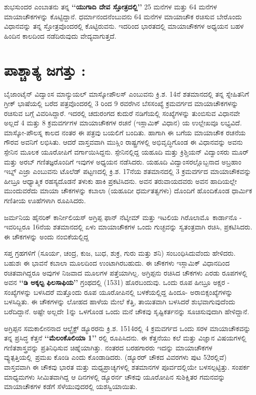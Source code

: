ಶುಭಸುಂದರ ಎಂಬಾತನು ತನ್ನ \textbf{‘‘ಯುಗಾದಿ ದೇವ ಸ್ತೋತ್ರದಲ್ಲಿ’’} 25 ಮನೆಗಳ ಮತ್ತು 64 ಮನೆಗಳ ಮಾಯಾಚೌಕಗಳನ್ನು ಕೊಟ್ಟಿದ್ದಾನೆ. ಧರ್ಮಾನಂದನೆಂಬುವನು 64 ಮನೆಗಳ ಮಾಯಾಚೌಕ ರಚಿಸುವ ಬೇರೊಂದು ವಿಧಾನವನ್ನು ತನ್ನ ಸ್ತೋತ್ರವೊಂದರಲ್ಲಿ ಕೊಟ್ಟಿರುವನು. ಇದರಿಂದ ಭಾರತದಲ್ಲಿ ಮಾಯಾಚೌಕಗಳ ಅಧ್ಯಯನ ಬಹಳ ಹಿಂದಿನ ಕಾಲದಿಂದ ನಡೆದಿರುವುದು ವೇದ್ಯವಾಗುತ್ತದೆ.

\section*{ಪಾಶ್ಚಾತ್ಯ ಜಗತ್ತು :}

ಬೈಜಾಂಟೈನ್ ವಿದ್ವಾಂಸ ಮಾನ್ಯುಯಲ್ ಮಾಸ್ಕೋಪೌಲಸ್ ಎಂಬುವನು ಕ್ರಿ.ಶ. 14ನೆ ಶತಮಾನದಲ್ಲಿ ತನ್ನ ಸ್ನೇಹಿತನಿಗೆ ಗ್ರೀಕ್ ಭಾಷೆಯಲ್ಲಿ ಬರೆದ ಪತ್ರವೊಂದರಲ್ಲಿ 3 ರಿಂದ 9 ರವರೆಗಿನ ಬೆಸಸಂಖ್ಯೆ ಕ್ರಮವರ್ಗದ ಮಾಯಾಚೌಕಗಳನ್ನು ರಚಿಸುವ ಬಗ್ಗೆ ವಿವರಿಸಿದ್ದಾರೆ. ಇದರಲ್ಲಿ ಚದುರಂಗದ ಕುದುರೆ ನಡಿಗೆಯಲ್ಲಿ ಸಂಖ್ಯೆಗಳನ್ನು ತುಂಬಿಸುವ ವಿಧಾನವೇ ಅಲ್ಲದೆ 4 ಮತ್ತು 8 ಕ್ರಮವರ್ಗಗಳ ಮಾಯಾಚೌಕಗಳ ರಚನೆ (ಇಸ್ಲಾಮಿಕ್ ವಿಧಾನ) ಯ ಉಲ್ಲೇಖವೂ ಲಭ್ಯವಿದೆ. ಮಾಸ್ಕೋ-ಪೌಲಸ್ನ ಕಾಲದ ನಂತರ ಈ ಪತ್ರವು ಬಯಲಿಗೆ ಬಂದಿತು. ಹಾಗಾಗಿ ಈ ಬಗೆಯ ಮಾಯಾಚೌಕ ರಚನೆಯ ಗೌರವ ಅವನಿಗೆ ಲಭಿಸಿತು. ಆದರೆ ವಾಸ್ತವವಾಗಿ ಮುಸ್ಲಿಂ ರಾಷ್ಟ್ರಗಳಲ್ಲಿ ಅಭಿವೃದ್ಧಿಗೊಂಡ ಈ ವಿಧಾನವನ್ನು ಅವನು ಸ್ಪೇನಿನ ಮೂಲಕ ಯೂರೋಪಿಗೆ ವರ್ಗಾಯಿಸಿದ್ದನು. ಸ್ಪೇನಿನಲ್ಲಿದ್ದ ಯಹೂದಿ ಮತ್ತು ಕ್ರಿಶ್ಚಿಯನ್ ವಿದ್ವಾಂಸರು ಮೂರ್ ಮತ್ತು ಅರಬ್ ಗಣಿತಜ್ಞರೊಂದಿಗೆ ಇವುಗಳ ಅಧ್ಯಯನ ನಡೆಸಿದರು. ಯಹೂದಿ ವಿದ್ವಾಂಸರಲ್ಲೊಬ್ಬನಾದ ಅಬ್ರಹಾಂ ಇಬ್ನ್ ಎಜ್ರಾ ಎಂಬುವನು ಟೊಲೆಡ್ ಪಟ್ಟಣದಲ್ಲಿ ಕ್ರಿ.ಶ. 17ನೆಯ ಶತಮಾನ\break ದಲ್ಲಿ 3 ಕ್ರಮವರ್ಗದ ಮಾಯಾಚೌಕವನ್ನು ಹೀಬ್ರೂ ಆಧ್ಯಾತ್ಮಿಕ ರಹಸ್ಯದೊಡನೆ ತಳುಕು ಹಾಕಿ ಪ್ರಕಟಿಸಿದನು. ಅವನ ತರುವಾಯದವರು ಅವನ ಹಾದಿಯಲ್ಲೇ ಮುಂದುವರೆದು ಮಾಯಾ ಚೌಕಗಳನ್ನು ಕಬಾಲಾ (ಯಹೂದೀ ಧರ್ಮತತ್ವಗಳು) ದೊಂದಿಗೆ ಹೊಂದಿಕೊಂಡ ಧಾರ್ಮಿಕ ಗಣಿತೀಯ ಊಹೆಗಳಾಗಿ ರೂಪಿಸಿದರು.

ಜರ್ಮನಿಯ ಹೈನರಿಕ್ ಕಾರ್ನೀಲಿಯಸ್ ಅಗ್ರಿಪ್ಪ ಫಾನ್ ನೆಟ್ಶೀಮ್​ ಮತ್ತು ಇಟಲಿಯ \hbox{ಗಿರೊಲಾಮೊ ಕಾರ್ಡಾನೊ} - ಇವರಿಬ್ಬರೂ 16ನೆಯ ಶತಮಾನದಲ್ಲಿ ಏಳು ಮಾಯಾಚೌಕಗಳ ಒಂದು ಗುಚ್ಛವನ್ನು ಸ್ವತಂತ್ರವಾಗಿ ರಚಿಸಿ, ಪ್ರಕಟಿಸಿದರು. ಈ ಚೌಕಗಳನ್ನು ಅಂದು ನಂಬಿಕೆಯಲ್ಲಿದ್ದ 

\medskip
ಸಪ್ತ ಗ್ರಹಗಳಿಗೆ (ಸೂರ್ಯ, ಚಂದ್ರ, ಕುಜ, ಬುಧ, ಶುಕ್ರ, ಗುರು ಮತ್ತು ಶನಿ) ಸಂಬಂಧಿಸಿ\-ದುವೆಂದು ಹೇಳಿದರು. ಬಹುಶಃ ಈ ಭಾವನೆ ಕಬಾಲಾ ಮೂಲದಿಂದ ಉಂಟಾಗಿರಬಹುದು. ಈ ಚೌಕಗಳು ಇಸ್ಲಾಮಿಕ್ ವಿಧಾನದಿಂದ ರಚಿತವಾಗಿದ್ದರೂ ಅವುಗಳ ನಿಜವಾದ ಮೂಲಗಳ ಪತ್ತೆಯಾಗಿಲ್ಲ. ಅಗ್ರಿಪ್ಪನು ರಚಿಸಿದ ಚೌಕಗಳು ಎರಡು ರೂಪಗಳಲ್ಲಿ ಅವನ \textbf{‘‘ಡಿ ಅಕ್ಕಲ್ಟ ಫಿಲಸಾಫಿಯ’’} ಗ್ರಂಥದಲ್ಲಿ (1531) ಹೊರಬಂದುವು. ಒಂದು ರೂಪ ಹೀಬ್ರೂ ಅಕ್ಷರ - ಸಂಖ್ಯೆಗಳನ್ನು ಬಳಸಿದರೆ ಮತ್ತೊಂದು ರೂಪ ಯೂರೋಪಿನಲ್ಲಿ ಬಳಕೆಯಲ್ಲಿದ್ದ ಹಿಂದೂ- ಅರಾಬಿಕ್ಸಂಖ್ಯೆಗಳನ್ನು ಬಳಸಿದ್ದಿತು. ಈ ಚೌಕಗಳನ್ನು ಲೋಹದ ಹಾಳೆಯ ಮೇಲೆ ಕೆತ್ತಿ, ತಾಯಿತವಾಗಿ ಬಳಸಿದರೆ ಶುಭವಾಗುವುದೆಂದು ಬರೆದಿದ್ದಾನೆ. ಅಷ್ಟೇ ಅಲ್ಲದೇ 1ನ್ನು ಒಳಗೊಂಡ ಒಂದು ಮನೆ ಚೌಕವು ಸೃಷ್ಟಿಕರ್ತನನ್ನು ಸೂಚಿಸುವುದಾಗಿ ಹೇಳಿದ್ದಾನೆ.

\medskip
ಅಗ್ರಿಪ್ಪನ ಸಮಕಾಲೀನನಾದ ಆಲ್ಬ್ರೆಕ್ಟ್ ಡ್ಯೂರರನು ಕ್ರಿ.ಶ. 1514ರಲ್ಲಿ 4 ಕ್ರಮವರ್ಗದ ಒಂದು ಸರಳ ಮಾಯಾಚೌಕವನ್ನು ತನ್ನ ಪ್ರಸಿದ್ಧ ಕೆತ್ತನೆ \textbf{‘‘ಮೆಲಂಕೊಲಿಯಾ 1’’} ರಲ್ಲಿ ರೂಪಿಸಿದನು. ಈ ಕೆತ್ತನೆಯು ಕಲೆ ಮತ್ತು ವಿಜ್ಞಾನ ವಿಷಯಗಳಲ್ಲಿ ಗಣಿತಶಾಸ್ತ್ರವನ್ನು ಪ್ರತಿನಿಧಿಸುವ \break ಚಿಹ್ನೆಯಾಗಿತ್ತು. ನಂತರದ ಬರಹಗಾರರು ಇದನ್ನು ಮಾಯಾಚೌಕಗಳ \hbox{ವ್ಯುತ್ಪತ್ತಿಯಲ್ಲಿ ಪ್ರಮಖ} ಕೊಂಡಿ ಎಂದು ಕೊಂಡಾಡಿದರು. (ಡ್ಯೂರರ್ ಚೌಕದ ವಿವರಗಳು ಪುಟ 52ರಲ್ಲಿವೆ) ವಾಸ್ತವ\-ವಾಗಿ ಈ ಚೌಕವು ಭಾರತ ಮತ್ತು ಮಧ್ಯಪ್ರಾಚ್ಯಗಳಲ್ಲಿ ಶತಮಾನಗಳ ಪೂರ್ವದಲ್ಲಿಯೇ ಬಳಸ\-ಲ್ಪಟ್ಟಿತ್ತು. ಸಂಪರ್ಕ ಮಾಧ್ಯಮಗಳು ಸೀಮಿತವಾಗಿದ್ದ ಆ ದಿನಗಳಲ್ಲಿ ಡ್ಯೂರರ್ನ ಚೌಕವು \linebreak ಯೂರೋಪಿನ ಸುಶಿಕ್ಷಿತರ ಗಮನವನ್ನು ಮಾಯಾಚೌಕಗಳ ಕಡೆಗೆ ಸೆಳೆಯುವುದರಲ್ಲಿ ಯಶಸ್ವಿ\-ಯಾಯಿತು.

